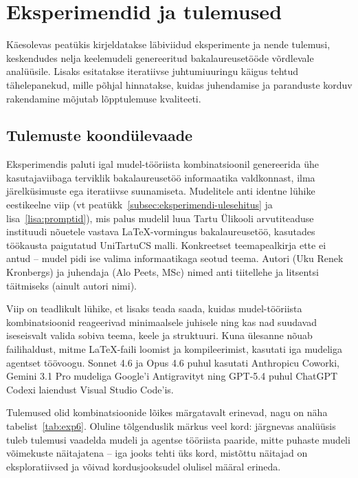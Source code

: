 \section{Eksperimendid ja tulemused} \label{eksperimendid}

Käesolevas peatükis kirjeldatakse läbiviidud eksperimente ja nende tulemusi, keskendudes nelja keelemudeli genereeritud bakalaureusetööde võrdlevale analüüsile. Lisaks esitatakse iteratiivse juhtumiuuringu käigus tehtud tähelepanekud, mille põhjal hinnatakse, kuidas juhendamise ja paranduste korduv rakendamine mõjutab lõpptulemuse kvaliteeti.

\subsection{Tulemuste koondülevaade} \label{subsec:exp-tervik}

Eksperimendis paluti igal mudel-tööriista kombinatsioonil genereerida ühe kasutajaviibaga terviklik bakalaureusetöö informaatika valdkonnast, ilma järelküsimuste ega iteratiivse suunamiseta. Mudelitele anti identne lühike eestikeelne viip (vt peatükk~\ref{subsec:eksperimendi-ulesehitus} ja lisa~\ref{lisa:promptid}), mis palus mudelil luua Tartu Ülikooli arvutiteaduse instituudi nõuetele vastava \LaTeX{}-vormingus bakalaureusetöö, kasutades töökausta paigutatud UniTartuCS malli. Konkreetset teemapealkirja ette ei antud -- mudel pidi ise valima informaatikaga seotud teema. Autori (Uku Renek Kronbergs) ja juhendaja (Alo Peets, MSc) nimed anti tiitellehe ja litsentsi täitmiseks (ainult autori nimi).

Viip on teadlikult lühike, et lisaks teada saada, kuidas mudel-tööriista kombinatsioonid reageerivad minimaalsele juhisele ning kas nad suudavad iseseisvalt valida sobiva teema, keele ja struktuuri. Kuna ülesanne nõuab failihaldust, mitme \LaTeX{}-faili loomist ja kompileerimist, kasutati iga mudeliga agentset töövoogu. Sonnet 4.6 ja Opus 4.6 puhul kasutati Anthropicu Coworki, Gemini 3.1 Pro mudeliga Google'i Antigravityt ning GPT-5.4 puhul ChatGPT Codexi laiendust Visual Studio Code'is.

Tulemused olid kombinatsioonide lõikes märgatavalt erinevad, nagu on näha tabelist~\ref{tab:exp6}. Oluline tõlgenduslik märkus veel kord: järgnevas analüüsis tuleb tulemusi vaadelda mudeli ja agentse tööriista paaride, mitte puhaste mudeli võimekuste näitajatena -- iga jooks tehti üks kord, mistõttu näitajad on eksploratiivsed ja võivad kordusjooksudel olulisel määral erineda.

